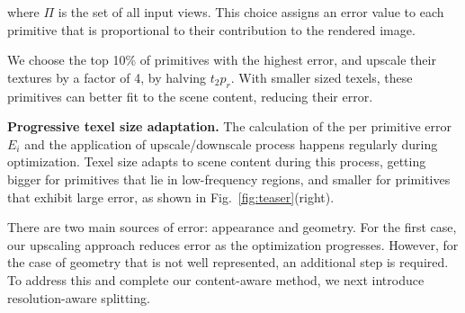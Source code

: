 \noindent
where $\Pi$ is the set of all input views.
This choice assigns an error value to each primitive that is proportional to their contribution to the rendered image.

We choose the top 10\% of primitives with the highest error, and upscale their textures by a factor of 4,
by halving $t_2p_r$.
With smaller sized texels,
these primitives can better fit to the scene content,
reducing their error.

\textbf{Progressive texel size adaptation.}
The calculation of the per primitive error $E_i$ and
the application of upscale/downscale process happens regularly during optimization.
Texel size adapts to scene content during this process, getting bigger for primitives that lie in low-frequency regions, and smaller for primitives that exhibit large error,
as shown in Fig.~\ref{fig:teaser}(right).

There are two main sources of error: appearance and geometry. For the first case, our upscaling approach reduces error as the optimization progresses.
However, for the case of geometry that is not well represented, an additional step is required.
To address this and complete our content-aware method, we next introduce resolution-aware splitting.

